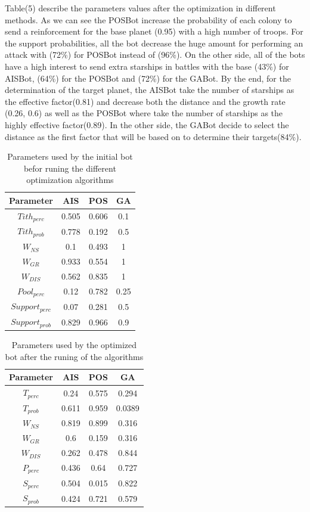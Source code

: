 \documentclass[]{interact}
\theoremstyle{plain}%
\theoremstyle{definition}
\theoremstyle{remark}
\begin{document}
Table(5) describe the parameters values after the optimization in different methods. As we can see the POSBot increase the probability of each colony to send a reinforcement for the base planet (0.95) with a high number of troops. For the support probabilities, all the bot decrease the huge amount for performing an attack with (72\%) for POSBot instead of (96\%). On the other side, all of the bots have a high interest to send extra starships in battles with the base (43\%) for AISBot, (64\%) for the POSBot and (72\%) for the GABot. By the end, for the determination of the target planet, the AISBot take the number of starships as the effective factor(0.81) and decrease both the distance and the growth rate (0.26, 0.6)  as well as the POSBot where take the number of starships as the highly effective factor(0.89). In the other side, the GABot decide to select the distance as the first factor that will be based on to determine their targets(84\%).

\begin{table}
\centering
\begin{tabular}{|c|c|c|c|}
\hline
 Parameter & AIS & POS & GA \\ 
 \hline
 $Tith_{perc}$ & 0.505 & 0.606 & 0.1\\  
 \hline
 $Tith_{prob}$ & 0.778 & 0.192 & 0.5\\
 \hline
 $W_{NS}$ & 0.1 & 0.493 & 1\\
 \hline
 $W_{GR}$ & 0.933 & 0.554 & 1\\
 \hline
 $W_{DIS}$ & 0.562 & 0.835 & 1\\
 \hline
 $Pool_{perc}$ & 0.12 & 0.782 & 0.25\\
 \hline
 $Support_{perc}$ & 0.07 & 0.281 & 0.5\\
 \hline
 $Support_{prob}$ & 0.829 & 0.966 & 0.9\\
 \hline  
\end{tabular}
\caption{Parameters used by the initial bot befor runing the different optimization algorithms}
\label{TABLE 4}
\end{table}

\begin{table}
\centering
\begin{tabular}{|c|c|c|c|}
\hline
 Parameter & AIS & POS & GA \\ 
 \hline
 $T_{perc}$ & 0.24 & 0.575 & 0.294\\  
 \hline
 $T_{prob}$ & 0.611 & 0.959 & 0.0389\\
 \hline
 $W_{NS}$ & 0.819 & 0.899 & 0.316\\
 \hline
 $W_{GR}$ & 0.6 & 0.159 & 0.316\\
 \hline
 $W_{DIS}$ & 0.262 & 0.478 & 0.844\\
 \hline
 $P_{perc}$ & 0.436 & 0.64 & 0.727\\
 \hline
 $S_{perc}$ & 0.504 & 0.015 & 0.822\\
 \hline
 $S_{prob}$ & 0.424 & 0.721 & 0.579\\
 \hline  
\end{tabular}
\caption{Parameters used by the optimized bot after the runing of the algorithms}
\label{TABLE 4}
\end{table}
\end{document}
